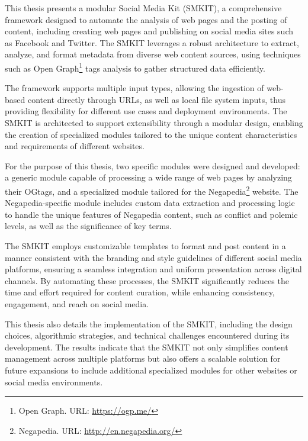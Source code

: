 
This thesis presents a modular Social Media Kit (SMKIT\addtoglossary), a comprehensive framework designed to automate the analysis of web pages and the posting of content, including creating web pages and publishing on social media sites such as Facebook and Twitter. The SMKIT leverages a robust architecture to extract, analyze, and format metadata from diverse web content sources, using techniques such as Open Graph\footnote{Open Graph. URL: \url{https://ogp.me/}} tags analysis to gather structured data efficiently. 

The framework supports multiple input types, allowing the ingestion of web-based content directly through URLs, as well as local file system inputs, thus providing flexibility for different use cases and deployment environments. The SMKIT is architected to support extensibility through a modular design, enabling the creation of specialized modules tailored to the unique content characteristics and requirements of different websites.

For the purpose of this thesis, two specific modules were designed and developed: a generic module capable of processing a wide range of web pages by analyzing their OG\addtoglossary tags, and a specialized module tailored for the Negapedia\footnote{Negapedia. URL: \url{http://en.negapedia.org/}} website. The Negapedia-specific module includes custom data extraction and processing logic to handle the unique features of Negapedia content, such as conflict and polemic levels, as well as the significance of key terms.

The SMKIT employs customizable templates to format and post content in a manner consistent with the branding and style guidelines of different social media platforms, ensuring a seamless integration and uniform presentation across digital channels. By automating these processes, the SMKIT significantly reduces the time and effort required for content curation, while enhancing consistency, engagement, and reach on social media.

This thesis also details the implementation of the SMKIT, including the design choices, algorithmic strategies, and technical challenges encountered during its development. The results indicate that the SMKIT not only simplifies content management across multiple platforms but also offers a scalable solution for future expansions to include additional specialized modules for other websites or social media environments.